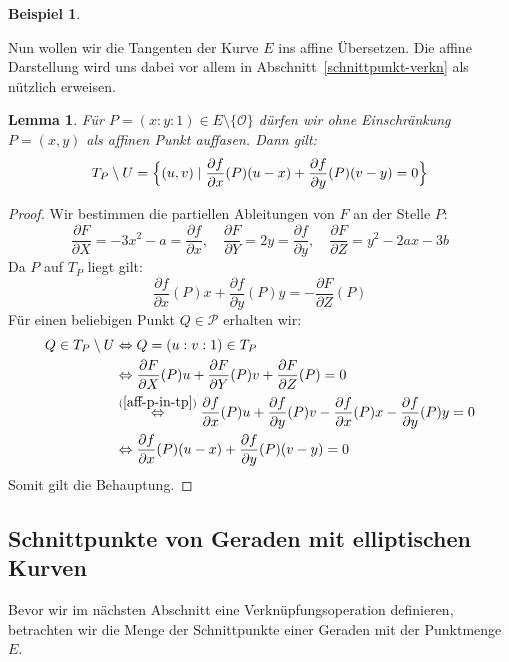 \documentclass[hidelinks]{article}
\theoremstyle{plain}
\newtheorem{lem}[thm]{Lemma}
\theoremstyle{definition}
\newtheorem{bsp}[thm]{Beispiel}
\theoremstyle{rem}
\newcommand{\patinf}{\mathcal{O}}
\begin{document}
\begin{sloppypar}
\begin{bsp}
\end{bsp}
Nun wollen wir die Tangenten der Kurve $E$ ins affine Übersetzen. Die affine Darstellung wird uns dabei vor allem in Abschnitt~\ref{schnittpunkt-verkn} als nützlich erweisen.
\begin{lem}
	Für $P=(x:y:1)\in E\setminus\{\patinf\}$ dürfen wir ohne Einschränkung $P=(x,y)$ als affinen Punkt auffasen. Dann gilt:
	\begin{equation*}
		T_P\setminus U =\Bigl\{(u,v)\mid \frac{\partial f}{\partial x}(P)(u-x)+\frac{\partial f}{\partial y}(P)(v-y)=0\Bigr\}
	\end{equation*}
\end{lem}
\begin{proof}
Wir bestimmen die partiellen Ableitungen von $F$ an der Stelle $P$:
\begin{equation*}
		\frac{\partial F}{\partial X}=-3x^2-a=\frac{\partial f}{\partial x},\quad \frac{\partial F}{\partial Y}=2y=\frac{\partial f}{\partial y},\quad \frac{\partial F}{\partial Z}=y^2-2ax-3b
\end{equation*}
Da $P$ auf $T_P$ liegt gilt:
\begin{equation}\label{aff-p-in-tp}
	\frac{\partial f}{\partial x}(P)x+\frac{\partial f}{\partial y}(P)y=-\frac{\partial F}{\partial Z}(P)
\end{equation}
Für einen beliebigen Punkt $Q\in\mathcal{P}$ erhalten wir:
\begin{align*}
	Q\in T_P\setminus U & \Leftrightarrow Q=(u:v:1)\in T_P\\
			    & \Leftrightarrow \frac{\partial F}{\partial X}(P)u+\frac{\partial F}{\partial Y}(P)v+\frac{\partial F}{\partial Z}(P)=0\\
	      & \stackrel{(\ref{aff-p-in-tp})}{\Leftrightarrow} \frac{\partial f}{\partial x}(P)u+\frac{\partial f}{\partial y}(P)v-\frac{\partial f}{\partial x}(P)x-\frac{\partial f}{\partial y}(P)y=0\\
	& \Leftrightarrow \frac{\partial f}{\partial x}(P)(u-x)+\frac{\partial f}{\partial y}(P)(v-y)=0
\end{align*}
Somit gilt die Behauptung.
\end{proof}

\subsection{Schnittpunkte von Geraden mit elliptischen Kurven}
Bevor wir im nächsten Abschnitt eine Verknüpfungsoperation definieren, betrachten wir die Menge der Schnittpunkte einer Geraden mit der Punktmenge $E$.\\


\end{sloppypar}
\end{document}
